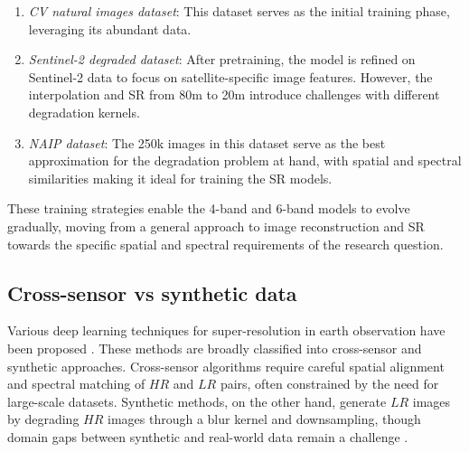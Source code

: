 \begin{enumerate}
    \item \textit{CV natural images dataset}: This dataset serves as the initial training phase, leveraging its abundant data.
    \item \textit{Sentinel-2 degraded dataset}: After pretraining, the model is refined on Sentinel-2 data to focus on satellite-specific image features. However, the interpolation and SR from 80m to 20m introduce challenges with different degradation kernels.
    \item \textit{NAIP dataset}: The 250k images in this dataset serve as the best approximation for the degradation problem at hand, with spatial and spectral similarities making it ideal for training the SR models.
\end{enumerate}

These training strategies enable the 4-band and 6-band models to evolve gradually, moving from a general approach to image reconstruction and SR towards the specific spatial and spectral requirements of the research question.

\subsection{Cross-sensor vs synthetic data}
Various deep learning techniques for super-resolution in earth observation have been proposed \autocite{wang2022review, liu2021research, sdraka2022deep}. These methods are broadly classified into cross-sensor and synthetic approaches. Cross-sensor algorithms require careful spatial alignment and spectral matching of $HR$ and $LR$ pairs, often constrained by the need for large-scale datasets. Synthetic methods, on the other hand, generate $LR$ images by degrading $HR$ images through a blur kernel and downsampling, though domain gaps between synthetic and real-world data remain a challenge \autocite{dong2022real, qiu2023cross, zhang2022single}.
